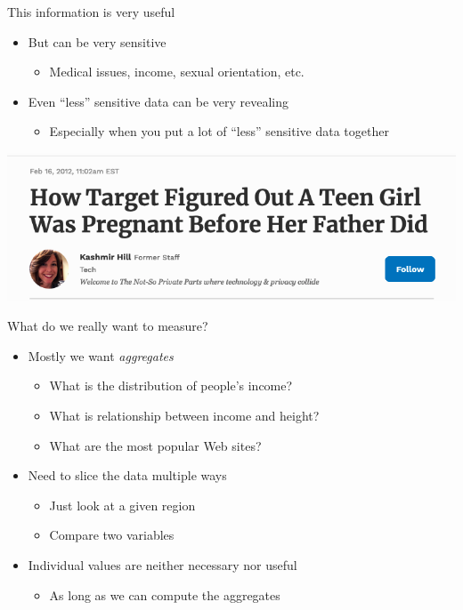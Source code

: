 \documentclass[helvetica]{beamer}
\begin{document}
\begin{frame}{This information is very useful}

  \begin{itemize}
    \item But can be very sensitive
    \begin{itemize}
    \item Medical issues, income, sexual orientation, etc.
    \end{itemize}
  \item Even ``less'' sensitive data can be very revealing
    \begin{itemize}
    \item Especially when you put a lot of ``less'' sensitive data together      
    \end{itemize}
  \end{itemize}


  \includegraphics[scale=.3]{target-pregnancy.png}
\end{frame}


\begin{frame}{What do we really want to measure?}

  \begin{itemize}
  \item Mostly we want \emph{aggregates}
    \begin{itemize}
     \item What is the distribution of people's income?
     \item What is relationship between income and height?
     \item What are the most popular Web sites?
    \end{itemize}
  \item Need to slice the data multiple ways
    \begin{itemize}
    \item Just look at a given region
    \item Compare two variables
    \end{itemize}
  \item Individual values are neither necessary nor useful
    \begin{itemize}
    \item As long as we can compute the aggregates      
    \end{itemize}    
  \end{itemize} 
\end{frame}
\end{document}
